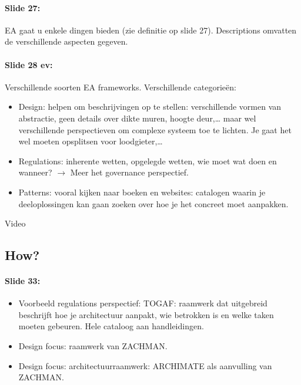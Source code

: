\documentclass[10pt,a4paper]{report}
\begin{document}
\paragraph{Slide 27:}EA gaat u enkele dingen bieden (zie definitie op slide 27).
Descriptions omvatten de verschillende aspecten gegeven.

\paragraph{Slide 28 ev:}Verschillende soorten EA frameworks. Verschillende categorieën:
\begin{itemize}
\item Design: helpen om beschrijvingen op te stellen: verschillende vormen van abstractie, geen details over dikte muren, hoogte deur,… maar wel verschillende perspectieven om complexe systeem toe te lichten. Je gaat het wel moeten opsplitsen voor loodgieter,…
\item Regulations: inherente wetten, opgelegde wetten, wie moet wat doen en wanneer? $\rightarrow$ Meer het governance perspectief.
\item Patterns: vooral kijken naar boeken en websites: catalogen waarin je deeloplossingen kan gaan zoeken over hoe je het concreet moet aanpakken.
\end{itemize}

Video

\subsection{How?}

\paragraph{Slide 33:}
\begin{itemize}
\item Voorbeeld regulations perspectief: TOGAF: raamwerk dat uitgebreid beschrijft hoe je architectuur aanpakt, wie betrokken is en welke taken moeten gebeuren. Hele cataloog aan handleidingen.
\item Design focus: raamwerk van ZACHMAN.
\item Design focus: architectuurraamwerk: ARCHIMATE als aanvulling van ZACHMAN.
\end{itemize}	
	
\end{document}
